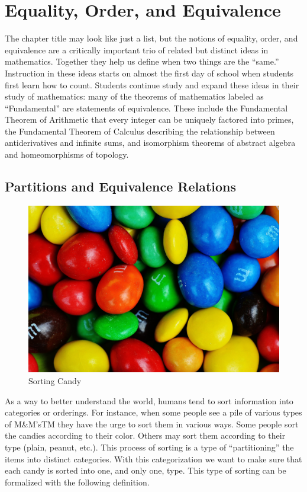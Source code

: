 \documentclass[
]{book}
\theoremstyle{definition}
\theoremstyle{definition}
\theoremstyle{definition}
\theoremstyle{definition}
\theoremstyle{remark}
\begin{document}
\hypertarget{equivalence}{%
\chapter{Equality, Order, and Equivalence}\label{equivalence}}

The chapter title may look like just a list, but the notions of equality, order, and equivalence are a critically important trio of related but distinct ideas in mathematics. Together they help us define when two things are the ``same.'' Instruction in these ideas starts on almost the first day of school when students first learn how to count. Students continue study and expand these ideas in their study of mathematics: many of the theorems of mathematics labeled as ``Fundamental'' are statements of equivalence. These include the Fundamental Theorem of Arithmetic that every integer can be uniquely factored into primes, the Fundamental Theorem of Calculus describing the relationship between antiderivatives and infinite sums, and isomorphism theorems of abstract algebra and homeomorphisms of topology.

\hypertarget{partitions-and-equivalence-relations}{%
\section{Partitions and Equivalence Relations}\label{partitions-and-equivalence-relations}}

\begin{figure}

{\centering \includegraphics[width=0.5\linewidth]{images/m-and-m-1308543_1920} 

}

\caption{Sorting Candy}\label{fig:unnamed-chunk-10}
\end{figure}

As a way to better understand the world, humans tend to sort information into categories or orderings. For instance, when some people see a pile of various types of M\&M'sTM they have the urge to sort them in various ways. Some people sort the candies according to their color. Others may sort them according to their type (plain, peanut, etc.). This process of sorting is a type of ``partitioning'' the items into distinct categories. With this categorization we want to make sure that each candy is sorted into one, and only one, type. This type of sorting can be formalized with the following definition.
\end{document}
